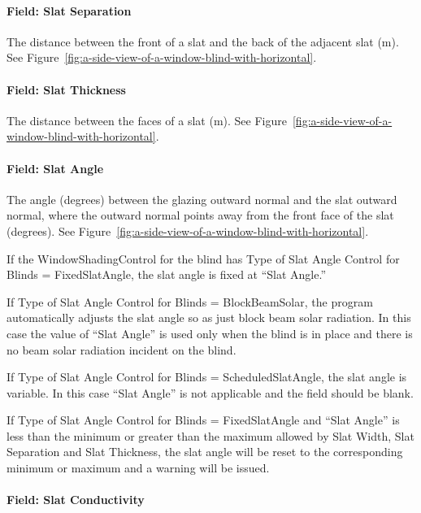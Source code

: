 \paragraph{Field: Slat Separation}\label{field-slat-separation}

The distance between the front of a slat and the back of the adjacent slat (m). See Figure~\ref{fig:a-side-view-of-a-window-blind-with-horizontal}.

\paragraph{Field: Slat Thickness}\label{field-slat-thickness}

The distance between the faces of a slat (m). See Figure~\ref{fig:a-side-view-of-a-window-blind-with-horizontal}.

\paragraph{Field: Slat Angle}\label{field-slat-angle}

The angle (degrees) between the glazing outward normal and the slat outward normal, where the outward normal points away from the front face of the slat (degrees). See Figure~\ref{fig:a-side-view-of-a-window-blind-with-horizontal}.

If the WindowShadingControl for the blind has Type of Slat Angle Control for Blinds = FixedSlatAngle, the slat angle is fixed at ``Slat Angle.''

If Type of Slat Angle Control for Blinds = BlockBeamSolar, the program automatically adjusts the slat angle so as just block beam solar radiation. In this case the value of ``Slat Angle'' is used only when the blind is in place and there is no beam solar radiation incident on the blind.

If Type of Slat Angle Control for Blinds = ScheduledSlatAngle, the slat angle is variable. In this case ``Slat Angle'' is not applicable and the field should be blank.

If Type of Slat Angle Control for Blinds = FixedSlatAngle and ``Slat Angle'' is less than the minimum or greater than the maximum allowed by Slat Width, Slat Separation and Slat Thickness, the slat angle will be reset to the corresponding minimum or maximum and a warning will be issued.

\paragraph{Field: Slat Conductivity}\label{field-slat-conductivity}

